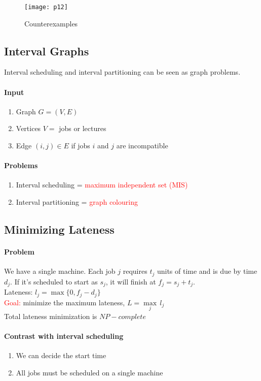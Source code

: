 \documentclass[11pt]{article}
\begin{document}
\begin{figure}[h]
	\centering
	\texttt{[image: p12]}
	\caption{Counterexamples}
\end{figure}

\subsection{Interval Graphs}
Interval scheduling and interval partitioning can be seen as graph problems.
\paragraph{Input}
\begin{enumerate}
	\item Graph $G = (V, E)$
	\item Vertices $V = $ jobs or lectures
	\item Edge $(i, j) \in E$ if jobs $i$ and $j$ are incompatible
\end{enumerate}

\paragraph{Problems}
\begin{enumerate}
	\item Interval scheduling = \textcolor{red}{maximum independent set (MIS)}
	\item Interval partitioning = \textcolor{red}{graph colouring}
\end{enumerate}

\subsection{Minimizing Lateness}
\paragraph{Problem}
We have a single machine. Each job $j$ requires $t_j$ units of time and is due by time $d_j$. If it's scheduled to start as $s_j$, it will finish at $f_j = s_j + t_j$.\\
Lateness: $l_j = \max\{0, f_j - d_j\}$\\
\textcolor{red}{Goal:} minimize the maximum lateness, $L = \underset{j}{\max} \,l_j$ \\
Total lateness minimization is $NP-complete$

\paragraph{Contrast with interval scheduling}
\begin{enumerate}
	\item We can decide the start time
	\item All jobs must be scheduled on a single machine
\end{enumerate}
\end{document}
